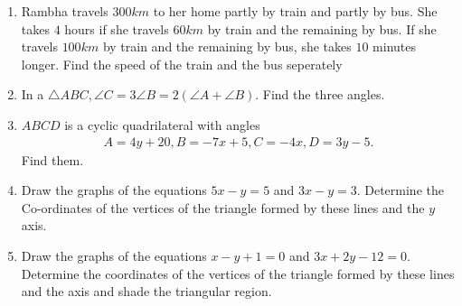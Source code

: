 \begin{enumerate}[label=\thesubsection.\arabic*, ref=\thesubsection.\theenumi]
\item Rambha travels $300 km$ to her home partly by train and partly by bus. She takes $4$ hours if she travels $60km$ by train and the remaining by bus. If she travels $100km$ by train and the remaining by bus,  she takes $10$ minutes longer. Find the speed of the train and the bus seperately
\item In a $\triangle ABC,  \angle C=3 \angle B=2(\angle A+\angle B)$.  Find the three angles. 
\item $ABCD$ is a cyclic quadrilateral 
	with angles
\begin{align}
	A = 4y+20,  B = -7x+5,  C = -4x,  D = 3y-5. 
\end{align}
Find them.  
\item Draw the graphs of the equations $5x-y=5$ and $3x-y=3$.  Determine the Co-ordinates of the vertices of the triangle formed by these lines and the $y$ axis. 
\item Draw the graphs of the equations $x-y+1=0$ and $3x+2y-12=0$.  Determine the coordinates of the vertices of the triangle formed by these lines and the axis and shade the triangular region. 
\end{enumerate}
